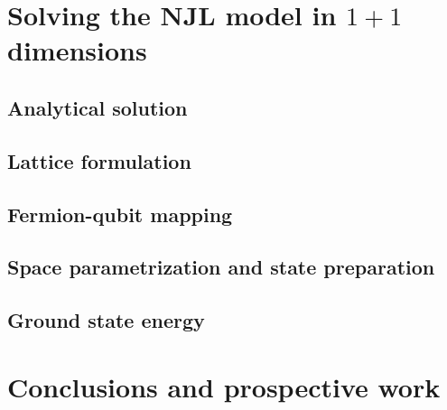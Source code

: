 \documentclass[9pt, handout, aspectratio=169]{beamer}	%
\begin{document}
\section{Solving the NJL model in $1+1$ dimensions}


\subsection{Analytical solution}


\subsection{Lattice formulation}


\subsection{Fermion-qubit mapping}


\subsection{Space parametrization and state preparation}


\subsection{Ground state energy}



\section{Conclusions and prospective work}


\end{document}
